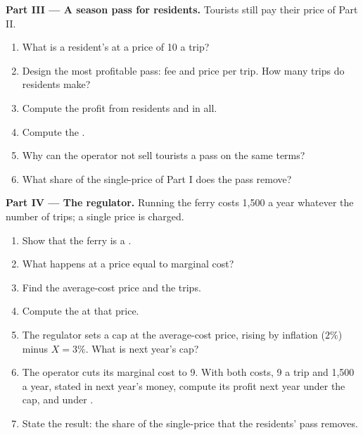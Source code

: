 \begin{problem}
\medskip\noindent\textbf{Part III --- A season pass for residents.} Tourists
still pay their price of Part II.
\begin{enumerate}[resume]
  \item What is a resident's  at a price of 10 a trip?
  \item Design the most profitable pass: fee and price per trip. How many trips do residents make?
  \item Compute the profit from residents and in all.
  \item Compute the .
  \item Why can the operator not sell tourists a pass on the same terms?
  \item What share of the single-price  of Part I does the pass remove?
\end{enumerate}

\medskip\noindent\textbf{Part IV --- The regulator.} Running the ferry costs
1,500 a year whatever the number of trips; a single price is charged.
\begin{enumerate}[resume]
  \item Show that the ferry is a .
  \item What happens at a price equal to marginal cost?
  \item Find the average-cost price and the trips.
  \item Compute the  at that price.
  \item The regulator sets a cap at the average-cost price, rising by inflation ($2\%$) minus $X = 3\%$. What is next year's cap?
  \item The operator cuts its marginal cost to 9. With both costs, 9 a trip and 1,500 a year, stated in next year's money, compute its profit next year under the cap, and under .
  \item State the result: the share of the single-price  that the residents' pass removes.
\end{enumerate}
\end{problem}
